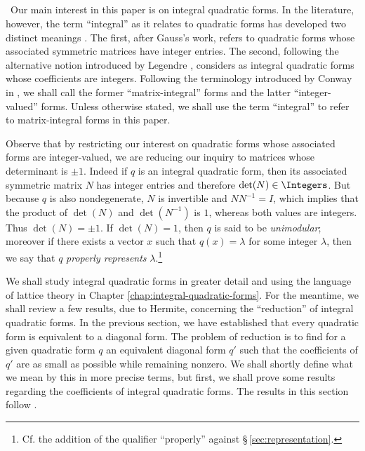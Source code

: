 \subsection{}~Our main interest in this paper is on integral quadratic forms. In the literature, however, the term ``integral'' as it relates to quadratic forms has developed two distinct meanings \cite{conway1999universal, conway1997sensual}. The first, after Gauss's work, refers to quadratic forms whose associated symmetric matrices have integer entries. The second, following the alternative notion introduced by Legendre \cite{legendre1808essai}, considers as integral quadratic forms whose coefficients are integers. Following the terminology introduced by Conway in \cite{conway1997sensual}, we shall call the former ``matrix-integral'' forms and the latter ``integer-valued'' forms. Unless otherwise stated, we shall use the term ``integral'' to refer to matrix-integral forms in this paper. \label{sec:integral-forms-def}

Observe that by restricting our interest on quadratic forms whose associated forms are integer-valued, we are reducing our inquiry to matrices whose determinant is \(\pm 1\). Indeed if \(q\) is an integral quadratic form, then its associated symmetric matrix \(N\) has integer entries and therefore \(\det(N) \in \Integers\). But because \(q\) is also nondegenerate, \(N\) is invertible and \(NN^{-1} = I\), which implies that the product of \(\det(N)\) and \(\det(N^{-1})\) is \(1\), whereas both values are integers. Thus \(\det(N) = \pm 1\). If \(\det(N) = 1\), then \(q\) is said to be \emph{unimodular}; moreover if there exists a vector \(x\) such that \(q(x) = \lambda\) for some integer \(\lambda\), then we say that \(q\) \emph{properly represents} \(\lambda\).\footnote{Cf. the addition of the qualifier ``properly'' against \S\,\ref{sec:representation}.}

We shall study integral quadratic forms in greater detail and using the language of lattice theory in Chapter \ref{chap:integral-quadratic-forms}. For the meantime, we shall review a few results, due to Hermite, concerning the ``reduction'' of integral quadratic forms. In the previous section, we have established that every quadratic form is equivalent to a diagonal form. The problem of reduction is to find for a given quadratic form \(q\) an equivalent diagonal form \(q'\) such that the coefficients of \(q'\) are as small as possible while remaining nonzero. We shall shortly define what we mean by this in more precise terms, but first, we shall prove some results regarding the coefficients of integral quadratic forms. The results in this section follow \cite{cassels2008rational,jones1950arithmetic, watson1960integral}.\label{sec:reduction}

